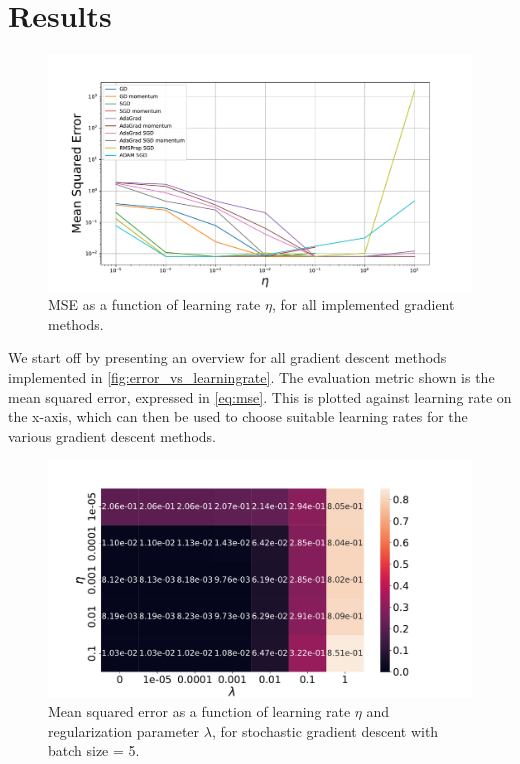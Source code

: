 \documentclass[12pt]{article}
\begin{document}
\section{Results} \label{sec:results}

\begin{figure}
    \centering
    \includegraphics[width=0.91\linewidth]{images/error_vs_learningrate.pdf}
    \caption{MSE as a function of learning rate $\eta$, for all implemented gradient methods.}
    \label{fig:error_vs_learningrate}
\end{figure}

We start off by presenting an overview for all gradient descent methods implemented in \autoref{fig:error_vs_learningrate}. The evaluation metric shown is the mean squared error, expressed in \autoref{eq:mse}. This is plotted against learning rate on the x-axis, which can then be used to choose suitable learning rates for the various gradient descent methods.

\begin{figure}
    \centering
    \includegraphics[width=0.91\linewidth]{images/eta_vs_lambda_SGD.pdf}
    \caption{Mean squared error as a function of learning rate $\eta$ and regularization parameter $\lambda$, for stochastic gradient descent with batch size = 5.}
    \label{fig:eta_vs_lambda_SGD}
\end{figure}
\end{document}
